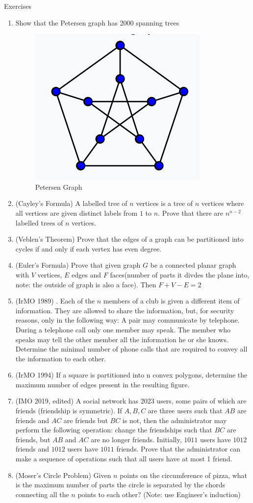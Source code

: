 \begin{xcb}{Exercises}
\begin{enumerate}
        \item Show that the Petersen graph has 2000 spanning trees 
\begin{figure}[h]
        \centering
        \includegraphics[width=0.5\linewidth]{Photos/Petersen Graph.png}
        \caption{Petersen Graph}
    \end{figure}
    \item (Cayley's Formula) A labelled tree of $n$ vertices is a tree of $n$ vertices where all vertices are given distinct labels from $1$ to $n$. Prove that there are $n^{n-2}$ labelled trees of $n$ vertices.
    \item(Veblen's Theorem) Prove that the edges of a graph can be partitioned into cycles if and only if each vertex has even degree.
    \item(Euler's Formula) Prove that given graph $G$ be a connected planar graph with $V$ vertices, $E$ edges and $F$ faces(number of parts it divdes the plane into, note: the outside of graph is also a face). Then $F + V - E = 2$
    \item (IrMO 1989) . Each of the $n$ members of a club is given a different item of information. They are allowed to share the information, but, for security reasons, only in the following way: A pair may communicate by telephone. During a telephone call only one member may speak. The member who speaks may tell the other member all the information he or she knows. Determine the minimal number of phone calls that are required to convey all the information to each other.
    \item (IrMO 1994) If a square is partitioned into n convex polygons, determine the maximum number of edges present in the resulting figure.
    \item (IMO 2019, edited) A social network has 2023 users, some pairs of which are friends (friendship is symmetric). If $A, B, C$ are three users such that $AB$ are friends and $AC$ are friends but $BC$ is not, then the administrator may perform the following operation: change the friendships such that $BC$ are friends, but $AB$ and $AC$ are no longer friends. Initially, $1011$ users have $1012$ friends and $1012$ users have $1011$ friends. Prove that the administrator can make a sequence of operations such that all users have at most 1 friend.
    \item (Moser's Circle Problem) Given $n$ points on the circumference of pizza, what is the maximum number of parts the circle is separated  by the chords connecting all the $n$ points to each other? (Note:  use Engineer's induction)
    \end{enumerate}
\end{xcb}